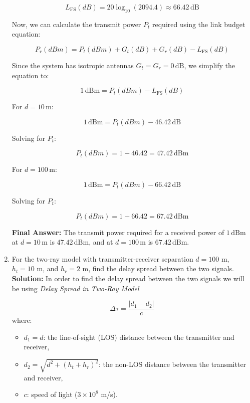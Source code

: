 \documentclass[a4paper,12pt]{book}
\begin{document}
\begin{enumerate}
		\[
		L_{\text{FS}}(dB) = 20 \log_{10}(2094.4) \approx 66.42 \, \text{dB}
		\]
		
		Now, we can calculate the transmit power \( P_t \) required using the link budget equation:
		
		\[
		P_r(dBm) = P_t(dBm) + G_t(dB) + G_r(dB) - L_{\text{FS}}(dB)
		\]
		
		Since the system has isotropic antennas \( G_t = G_r = 0 \, \text{dB} \), we simplify the equation to:
		
		\[
		1 \, \text{dBm} = P_t(dBm) - L_{\text{FS}}(dB)
		\]
		
		For \( d = 10 \, \text{m} \):
		
		\[
		1 \, \text{dBm} = P_t(dBm) - 46.42 \, \text{dB}
		\]
		
		Solving for \( P_t \):
		
		\[
		P_t(dBm) = 1 + 46.42 = 47.42 \, \text{dBm}
		\]
		
		For \( d = 100 \, \text{m} \):
		
		\[
		1 \, \text{dBm} = P_t(dBm) - 66.42 \, \text{dB}
		\]
		
		Solving for \( P_t \):
		
		\[
		P_t(dBm) = 1 + 66.42 = 67.42 \, \text{dBm}
		\]
		
		\textbf{Final Answer:} The transmit power required for a received power of \( 1 \, \text{dBm} \) at \( d = 10 \, \text{m} \) is \( 47.42 \, \text{dBm} \), and at \( d = 100 \, \text{m} \) is \( 67.42 \, \text{dBm} \).
		
		\item For the two-ray model with transmitter-receiver separation $d = 100$ m, $h_t = 10$ m, and $h_r = 2$ m, find the delay spread between the two signals.
		\newline\newline\noindent\textbf{Solution:} In order to find the delay spread between the two signals we will be using \textit{Delay Spread in Two-Ray Model}
		
		\[
		\Delta \tau = \frac{|d_1 - d_2|}{c}
		\]
		where:
		\begin{itemize}
			\item \( d_1 = d \): the line-of-sight (LOS) distance between the transmitter and receiver,
			\item \( d_2 = \sqrt{d^2 + (h_t + h_r)^2} \): the non-LOS distance between the transmitter and receiver,
			\item \( c \): speed of light (\(3 \times 10^8\) m/s).
		\end{itemize}
		

\end{enumerate}
\end{document}
